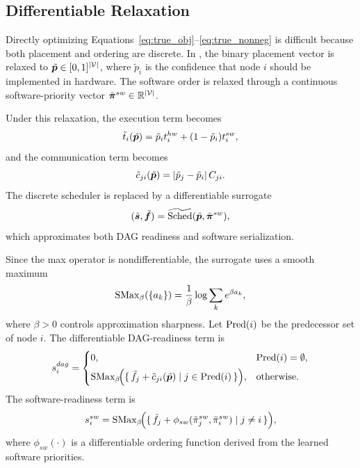 \subsection{Differentiable Relaxation}
Directly optimizing Equations~\eqref{eq:true_obj}--\eqref{eq:true_nonneg} is difficult because both placement and ordering are discrete. In \diffgnnorder, the binary placement vector is relaxed to $\tilde{\bm{p}}\in[0,1]^{|\mathcal{V}|}$, where $\tilde{p}_i$ is the confidence that node $i$ should be implemented in hardware. The software order is relaxed through a continuous software-priority vector $\tilde{\bm{\pi}}^{sw}\in\mathbb{R}^{|\mathcal{V}|}$.

Under this relaxation, the execution term becomes
\begin{equation}
\tilde{t}_i(\tilde{\bm{p}}) = \tilde{p}_i t_i^{hw} + (1-\tilde{p}_i)t_i^{sw},
\label{eq:soft_exec_i}
\end{equation}
and the communication term becomes
\begin{equation}
\tilde{c}_{ji}(\tilde{\bm{p}}) = |\tilde{p}_j-\tilde{p}_i|\, C_{ji}.
\label{eq:soft_comm_ji}
\end{equation}
The discrete scheduler is replaced by a differentiable surrogate
\begin{equation}
(\tilde{\bm{s}},\tilde{\bm{f}})=
\widetilde{\mathrm{Sched}}(\tilde{\bm{p}},\tilde{\bm{\pi}}^{sw}),
\label{eq:soft_sched}
\end{equation}
which approximates both DAG readiness and software serialization.

Since the max operator is nondifferentiable, the surrogate uses a smooth maximum
\begin{equation}
\mathrm{SMax}_{\beta}(\{a_k\})=\frac{1}{\beta}\log\sum_k e^{\beta a_k},
\label{eq:smax_beta}
\end{equation}
where $\beta>0$ controls approximation sharpness. Let $\mathrm{Pred}(i)$ be the predecessor set of node $i$. The differentiable DAG-readiness term is
\begin{equation}
s_i^{dag}
=
\begin{cases}
0, & \mathrm{Pred}(i)=\emptyset,\\[4pt]
\mathrm{SMax}_{\beta}\!\Big(\{\, \tilde{f}_j + \tilde{c}_{ji}(\tilde{\bm{p}}) \mid j \in \mathrm{Pred}(i)\,\}\Big), & \text{otherwise}.
\end{cases}
\label{eq:soft_rdag}
\end{equation}
The software-readiness term is
\begin{equation}
s_i^{sw}
=
\mathrm{SMax}_{\beta}\!\Big(\{\, \tilde{f}_j + \phi_{sw}(\tilde{\pi}_j^{sw}, \tilde{\pi}_i^{sw}) \mid j \neq i\,\}\Big),
\label{eq:soft_rsw}
\end{equation}
where $\phi_{sw}(\cdot)$ is a differentiable ordering function derived from the learned software priorities.

